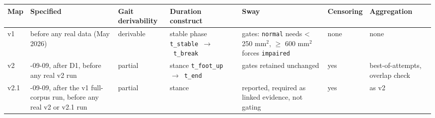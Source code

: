 \documentclass[11pt]{article}
\begin{document}
\begin{longtable}[]{@{}
  >{\raggedright\arraybackslash}p{}
  >{\raggedright\arraybackslash}p{}
  >{\raggedright\arraybackslash}p{}
  >{\raggedright\arraybackslash}p{}
  >{\raggedright\arraybackslash}p{}
  >{\raggedright\arraybackslash}p{}
  >{\raggedright\arraybackslash}p{}@{}}
\toprule\noalign{}
\begin{minipage}[b]{\linewidth}\raggedright
Map
\end{minipage} & \begin{minipage}[b]{\linewidth}\raggedright
Specified
\end{minipage} & \begin{minipage}[b]{\linewidth}\raggedright
Gait derivability
\end{minipage} & \begin{minipage}[b]{\linewidth}\raggedright
Duration construct
\end{minipage} & \begin{minipage}[b]{\linewidth}\raggedright
Sway
\end{minipage} & \begin{minipage}[b]{\linewidth}\raggedright
Censoring
\end{minipage} & \begin{minipage}[b]{\linewidth}\raggedright
Aggregation
\end{minipage} \\
\midrule\noalign{}
\endhead
\bottomrule\noalign{}
\endlastfoot
v1 & before any real data (May 2026) & derivable & stable phase \texttt{t\_stable\ $\rightarrow$\ t\_break} & gates: \texttt{normal} needs \textless{} 250 mm$^{2}$, $\geq$ 600 mm$^{2}$ forces \texttt{impaired} & none & none \\
v2 & 2026-09-09, after D1, before any real v2 run & partial & stance \texttt{t\_foot\_up\ $\rightarrow$\ t\_end} & gates retained unchanged & yes & best-of-attempts, overlap check \\
v2.1 & 2026-09-09, after the v1 full-corpus run, before any real v2 or v2.1 run & partial & stance & reported, required as linked evidence, not gating & yes & as v2 \\
\end{longtable}
\end{document}
